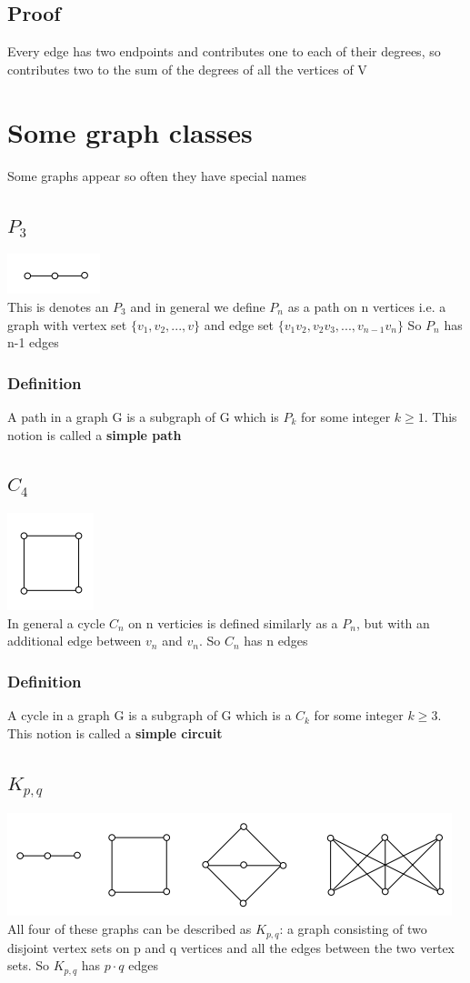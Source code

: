 \documentclass{article}[18pt]
\begin{document}
\subsection{Proof}
Every edge has two endpoints and contributes one to each of their degrees, so contributes two to the sum of the degrees of all the vertices of V
\section{Some graph classes}
Some graphs appear so often they have special names
\subsection{$P_3$}
\includegraphics[scale=1.5]{p3}\\
This is denotes an $P_3$ and in general we define $P_n$ as a path on n vertices i.e. a graph with vertex set $\{v_1,v_2,...,v\}$ and edge set $\{v_1v_2,v_2v_3,...,v_{n-1}v_n\}$ So $P_n$ has n-1 edges
\subsubsection{Definition}
A path in a graph G is a subgraph of G which is $P_k$ for some integer $k\geqslant 1$. This notion is called a \textbf{simple path}
\subsection{$C_4$}
\includegraphics[scale=1.5]{c4}\\
In general a cycle $C_n$ on n verticies is defined similarly as a $P_n$, but with an additional edge between $v_n$ and $v_n$. So $C_n$ has n edges
\subsubsection{Definition}
A cycle in a graph G is a subgraph of G which is a $C_k$ for some integer $k\geqslant 3$. This notion is called a \textbf{simple circuit}
\subsection{$K_{p,q}$}
\includegraphics[scale=1.4]{kpq}\\
All four of these graphs can be described as $K_{p,q}$: a graph consisting of two disjoint vertex sets on p and q vertices and all the edges between the two vertex sets. So $K_{p,q}$ has $p\cdot q$ edges
\end{document}
